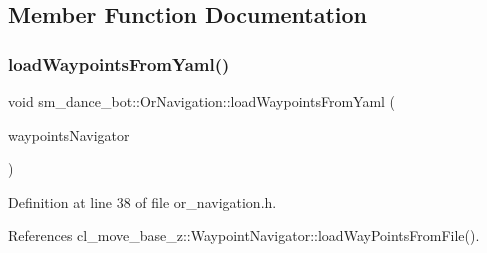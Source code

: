 \subsection{Member Function Documentation}
\mbox{\label{classsm__dance__bot_1_1OrNavigation_a1f092ffe3a1b29ae9ea6623aff00ab16}} 
\subsubsection{\texorpdfstring{load\+Waypoints\+From\+Yaml()}{loadWaypointsFromYaml()}}
{\footnotesize\ttfamily void sm\+\_\+dance\+\_\+bot\+::\+Or\+Navigation\+::load\+Waypoints\+From\+Yaml (\begin{DoxyParamCaption}\item[{\hyperlink{classcl__move__base__z_1_1WaypointNavigator}{Waypoint\+Navigator} $\ast$}]{waypoints\+Navigator }\end{DoxyParamCaption})\hspace{0.3cm}{\ttfamily [inline]}}



Definition at line 38 of file or\+\_\+navigation.\+h.



References cl\+\_\+move\+\_\+base\+\_\+z\+::\+Waypoint\+Navigator\+::load\+Way\+Points\+From\+File().


